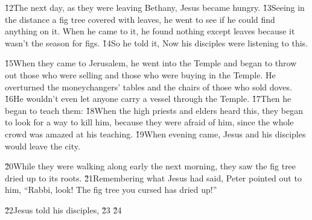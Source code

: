 \v{12}The next day, as they were leaving Bethany, Jesus became hungry. \v{13}Seeing in the distance a fig tree covered with leaves, he went to see if he could find anything on it. When he came to it, he found nothing except leaves because it wasn't the season for figs. \v{14}So he told it,  Now his disciples were listening to this.

\v{15}When they came to Jerusalem, he went into the Temple and began to throw out those who were selling and those who were buying in the Temple. He overturned the moneychangers' tables and the chairs of those who sold doves. \v{16}He wouldn't even let anyone carry a vessel through the Temple. \v{17}Then he began to teach them:    \v{18}When the high priests and elders heard this, they began to look for a way to kill him, because they were afraid of him, since the whole crowd was amazed at his teaching. \v{19}When evening came, Jesus and his disciples would leave the city.

\v{20}While they were walking along early the next morning, they saw the fig tree dried up to its roots. \v{21}Remembering what Jesus had said, Peter pointed out to him, ``Rabbi, look! The fig tree you cursed has dried up!''

\v{22}Jesus told his disciples,  \v{23}  \v{24}  

